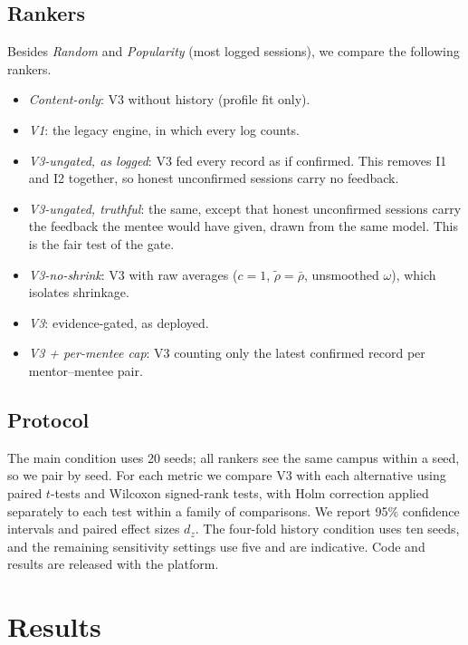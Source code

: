 \documentclass[conference]{IEEEtran}
\begin{document}
\subsection{Rankers}
Besides \emph{Random} and \emph{Popularity} (most logged sessions), we compare the following rankers.
\begin{itemize}
\item \emph{Content-only}: V3 without history (profile fit only).
\item \emph{V1}: the legacy engine, in which every log counts.
\item \emph{V3-ungated, as logged}: V3 fed every record as if confirmed. This removes I1 and I2 together, so honest unconfirmed sessions carry no feedback.
\item \emph{V3-ungated, truthful}: the same, except that honest unconfirmed sessions carry the feedback the mentee would have given, drawn from the same model. This is the fair test of the gate.
\item \emph{V3-no-shrink}: V3 with raw averages ($c=1$, $\tilde\rho=\bar\rho$, unsmoothed $\omega$), which isolates shrinkage.
\item \emph{V3}: evidence-gated, as deployed.
\item \emph{V3 + per-mentee cap}: V3 counting only the latest confirmed record per mentor--mentee pair.
\end{itemize}

\subsection{Protocol}
The main condition uses 20 seeds; all rankers see the same campus within a seed, so we pair by seed. For each metric we compare V3 with each alternative using paired $t$-tests and Wilcoxon signed-rank tests, with Holm correction applied separately to each test within a family of comparisons. We report 95\% confidence intervals and paired effect sizes $d_z$. The four-fold history condition uses ten seeds, and the remaining sensitivity settings use five and are indicative. Code and results are released with the platform.

\section{Results}
\label{sec:results}
\end{document}
